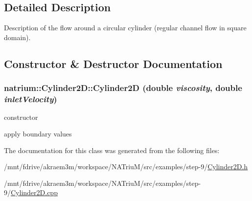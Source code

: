 \subsection{Detailed Description}
Description of the flow around a circular cylinder (regular channel flow in square domain). 

\subsection{Constructor \& Destructor Documentation}
\hypertarget{classnatrium_1_1Cylinder2D_a38e5826b6fd4fc859b74783de3999658}{
\subsubsection[{Cylinder2D}]{\setlength{\rightskip}{0pt plus 5cm}natrium::Cylinder2D::Cylinder2D (double {\em viscosity}, \/  double {\em inletVelocity})}}
\label{classnatrium_1_1Cylinder2D_a38e5826b6fd4fc859b74783de3999658}


constructor 

apply boundary values 

The documentation for this class was generated from the following files:\begin{DoxyCompactItemize}
\item 
/mnt/fdrive/akraem3m/workspace/NATriuM/src/examples/step-\/9/\hyperlink{Cylinder2D_8h}{Cylinder2D.h}\item 
/mnt/fdrive/akraem3m/workspace/NATriuM/src/examples/step-\/9/\hyperlink{Cylinder2D_8cpp}{Cylinder2D.cpp}\end{DoxyCompactItemize}
